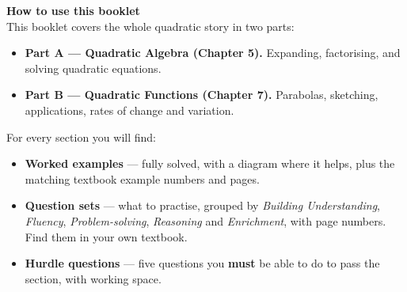 \documentclass[11pt]{article}
\begin{document}
\thispagestyle{empty}
\vspace{60mm}
\vspace{5mm}
\begin{refbox}
{\bfseries\color{chalkdk}How to use this booklet}\\[2pt]
This booklet covers the whole quadratic story in two parts:
\begin{itemize}[leftmargin=16pt,itemsep=2pt,topsep=3pt]
  \item \textbf{Part A --- Quadratic Algebra (Chapter 5).} Expanding, factorising, and solving quadratic equations.
  \item \textbf{Part B --- Quadratic Functions (Chapter 7).} Parabolas, sketching, applications, rates of change and variation.
\end{itemize}
\vspace{3pt}For every section you will find:
\begin{itemize}[leftmargin=16pt,itemsep=2pt,topsep=3pt]
  \item \textbf{Worked examples} --- fully solved, with a diagram where it helps, plus the matching textbook example numbers and pages.
  \item \textbf{Question sets} --- what to practise, grouped by \textit{Building Understanding}, \textit{Fluency}, \textit{Problem-solving}, \textit{Reasoning} and \textit{Enrichment}, with page numbers. Find them in your own textbook.
  \item \textbf{Hurdle questions} --- five questions you \textbf{must} be able to do to pass the section, with working space.
\end{itemize}
\end{refbox}
\end{document}

